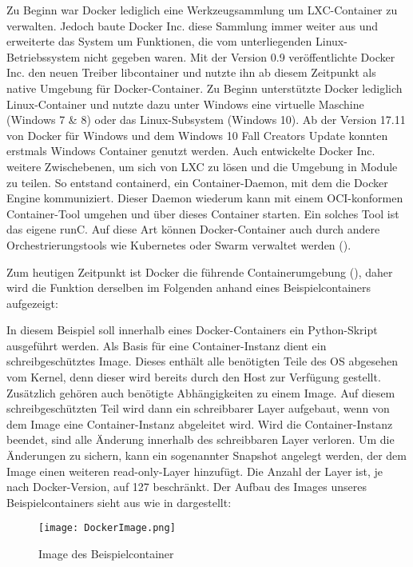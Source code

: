 Zu Beginn war Docker lediglich eine Werkzeugsammlung um \ac{LXC}-Container zu verwalten. Jedoch baute Docker Inc. diese Sammlung immer weiter aus und erweiterte das System um Funktionen, die vom unterliegenden Linux-Betriebssystem nicht gegeben waren. Mit der Version 0.9 veröffentlichte Docker Inc. den neuen Treiber libcontainer und nutzte ihn ab diesem Zeitpunkt als native Umgebung für Docker-Container. \cite{dockerblog2} Zu Beginn unterstützte Docker lediglich Linux-Container und nutzte dazu unter Windows eine virtuelle Maschine (Windows 7 \& 8) oder das Linux-Subsystem (Windows 10). Ab der Version 17.11 von Docker für Windows und dem Windows 10 Fall Creators Update konnten erstmals Windows Container genutzt werden. \cite{dockerblogwin} Auch entwickelte Docker Inc. weitere Zwischebenen, um sich von \ac{LXC} zu lösen und die Umgebung in Module zu teilen. So entstand containerd, ein Container-Daemon, mit dem die Docker Engine kommuniziert. Dieser Daemon wiederum kann mit einem OCI-konformen Container-Tool umgehen und über dieses Container starten. Ein solches Tool ist das eigene runC. Auf diese Art können Docker-Container auch durch andere Orchestrierungstools wie Kubernetes oder Swarm verwaltet werden (\Vgl {}).\cite{Buch}

Zum heutigen Zeitpunkt ist Docker die führende Containerumgebung (\Vgl {}), daher wird die Funktion derselben im Folgenden anhand eines Beispielcontainers aufgezeigt:

In diesem Beispiel soll innerhalb eines Docker-Containers ein Python-Skript ausgeführt werden. Als Basis für eine Container-Instanz dient ein schreibgeschütztes Image. Dieses enthält alle benötigten Teile des OS abgesehen vom Kernel, denn dieser wird bereits durch den Host zur Verfügung gestellt. Zusätzlich gehören auch benötigte Abhängigkeiten zu einem Image. Auf diesem schreibgeschützten Teil wird dann ein schreibbarer Layer aufgebaut, wenn von dem Image eine Container-Instanz abgeleitet wird. Wird die Container-Instanz beendet, sind alle Änderung innerhalb des schreibbaren Layer verloren. Um die Änderungen zu sichern, kann ein sogenannter Snapshot angelegt werden, der dem Image einen weiteren read-only-Layer hinzufügt. Die Anzahl der Layer ist, je nach Docker-Version, auf 127 beschränkt. \cite{Buch, dockermanual} \newpage Der Aufbau des Images unseres Beispielcontainers sieht aus wie in  dargestellt:

\begin{figure}[h]
    \begin{center}
        \texttt{[image: DockerImage.png]}
    \end{center}
    \caption[Image des Beispielcontainer ]{Image des Beispielcontainer}
    \label{fig:docker1}
    \end{figure}

